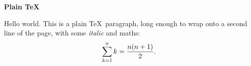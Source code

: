 \centerline{\bf Plain \TeX}
\medskip
Hello world. This is a plain \TeX\ paragraph, long enough to wrap onto a
second line of the page, with some {\it italic} and maths:
$$\sum_{k=1}^n k = {n(n+1)\over 2}.$$
\bye
